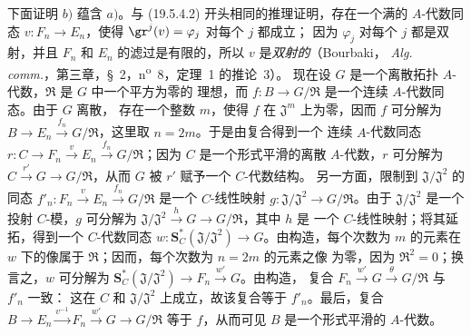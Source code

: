\begin{env}[19.5.4.3]
\label{0.19.5.4.3-fr}
下面证明 $b)$ 蕴含 $a)$。与 (19.5.4.2) 开头相同的推理证明，存在一个满的
$A$-代数同态 $v:F_n\to E_n$，使得 $\gr^j(v)=\varphi_j$ 对每个 $j$ 都成立；
因为 $\varphi_j$ 对每个 $j$ 都是双射，并且 $F_n$ 和
$E_n$ 的滤过是有限的，所以 $v$ 是\emph{双射的}（Bourbaki，
\emph{Alg. comm.}，第三章，§~2，n\textsuperscript{o}~8，定理~1 的推论~3）。
现在设 $G$ 是一个离散拓扑 $A$-代数，$\mathfrak R$ 是 $G$ 中一个平方为零的
理想，而 $f:B\to G/\mathfrak R$ 是一个连续 $A$-代数同态。由于 $G$ 离散，
存在一个整数 $m$，使得 $f$ 在 $\mathfrak J^m$ 上为零，因而 $f$ 可分解为
$B\to E_n\xrightarrow{f_n}G/\mathfrak R$，这里取 $n=2m$。于是由复合得到一个
连续 $A$-代数同态
$r:C\to F_n\xrightarrow{v}E_n\xrightarrow{f_n}G/\mathfrak R$；因为 $C$
是一个形式平滑的离散 $A$-代数，$r$ 可分解为
$C\xrightarrow{r'}G\to G/\mathfrak R$，从而 $G$ 被 $r'$ 赋予一个 $C$-代数结构。
另一方面，限制到 $\mathfrak J/\mathfrak J^2$ 的同态
$f'_n:F_n\xrightarrow{v}E_n\xrightarrow{f_n}G/\mathfrak R$ 是一个 $C$-线性映射
$g:\mathfrak J/\mathfrak J^2\to G/\mathfrak R$。由于
$\mathfrak J/\mathfrak J^2$ 是一个投射 $C$-模，$g$ 可分解为
$\mathfrak J/\mathfrak J^2\xrightarrow{h}G\to G/\mathfrak R$，其中 $h$ 是
一个 $C$-线性映射；将其延拓，得到一个 $C$-代数同态
$w:\mathbf S_C^*(\mathfrak J/\mathfrak J^2)\to G$。由构造，每个次数为 $m$
的元素在 $w$ 下的像属于 $\mathfrak R$；因而，每个次数为 $n=2m$ 的元素之像
为零，因为 $\mathfrak R^2=0$；换言之，$w$ 可分解为
$\mathbf S_C^*(\mathfrak J/\mathfrak J^2)\to F_n\xrightarrow{w'}G$。由构造，
复合 $F_n\xrightarrow{w'}G\xrightarrow{\theta}G/\mathfrak R$ 与 $f'_n$ 一致：
这在 $C$ 和 $\mathfrak J/\mathfrak J^2$ 上成立，故该复合等于 $f'_n$。最后，复合
$B\to E_n\xrightarrow{v^{-1}}F_n\xrightarrow{w'}G\to G/\mathfrak R$ 等于
$f$，从而可见 $B$ 是一个形式平滑的 $A$-代数。
\end{env}

